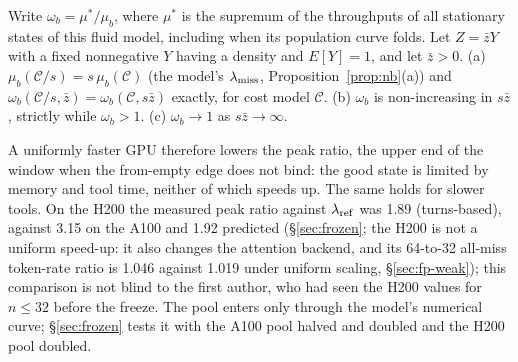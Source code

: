\begin{proposition}\label{prop:scaling}
Write $\omega_b=\mu^*/\mu_b$, where $\mu^*$ is the supremum of the throughputs of all stationary states of this fluid model, including when its population curve folds. Let $Z=\bar zY$ with a fixed nonnegative $Y$ having a density and $E[Y]=1$, and let $\bar z>0$. (a) $\mu_b(\mathcal C/s)=s\,\mu_b(\mathcal C)$ (the model's $\lambda_{\mathrm{miss}}$, Proposition~\ref{prop:nb}(a)) and $\omega_b(\mathcal C/s,\bar z)=\omega_b(\mathcal C,s\bar z)$ exactly, for cost model $\mathcal C$. (b) $\omega_b$ is non-increasing in $s\bar z$, strictly while $\omega_b>1$. (c) $\omega_b\to1$ as $s\bar z\to\infty$.
\end{proposition}
\noindent A uniformly faster GPU therefore lowers the peak ratio, the upper end of the window when the from-empty edge does not bind: the good state is limited by memory and tool time, neither of which speeds up. The same holds for slower tools. On the H200 the measured peak ratio against $\lambda_{\mathrm{ref}}$ was 1.89 (turns-based), against 3.15 on the A100 and 1.92 predicted (\S\ref{sec:frozen}; the H200 is not a uniform speed-up: it also changes the attention backend, and its 64-to-32 all-miss token-rate ratio is 1.046 against 1.019 under uniform scaling, \S\ref{sec:fp-weak}); this comparison is not blind to the first author, who had seen the H200 values for $n\le32$ before the freeze. The pool enters only through the model's numerical curve; \S\ref{sec:frozen} tests it with the A100 pool halved and doubled and the H200 pool doubled.

